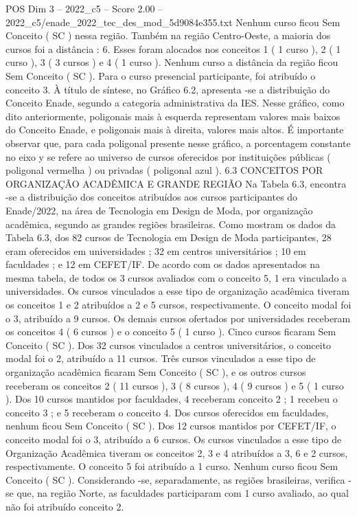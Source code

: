 \begin{textsample}{POS Dim 3 – 2022\_c5 – Score 2.00 – 2022\_c5/enade\_2022\_tec\_des\_mod\_5d9084e355.txt}
Nenhum curso ficou Sem Conceito ( SC ) nessa região.
Também na região Centro-Oeste, a maioria dos cursos foi a distância : 6.
Esses foram alocados nos conceitos 1 ( 1 curso ), 2 ( 1 curso ), 3 ( 3 cursos ) e 4 ( 1 curso ).
Nenhum curso a distância da região ficou Sem Conceito ( SC ).
Para o curso presencial participante, foi atribuído o conceito 3.
À título de síntese, no Gráfico 6.2, apresenta -se a distribuição do Conceito Enade, segundo a categoria administrativa da IES.
Nesse gráfico, como dito anteriormente, poligonais mais à esquerda representam valores mais baixos do Conceito Enade, e poligonais mais à direita, valores mais altos.
É importante observar que, para cada poligonal presente nesse gráfico, a porcentagem constante no eixo y se refere ao universo de cursos oferecidos por instituições públicas ( poligonal vermelha ) ou privadas ( poligonal azul ). 6.3 CONCEITOS POR ORGANIZAÇÃO ACADÊMICA E GRANDE REGIÃO Na Tabela 6.3, encontra -se a distribuição dos conceitos atribuídos aos cursos participantes do Enade/2022, na área de Tecnologia em Design de Moda, por organização acadêmica, segundo as grandes regiões brasileiras.
Como mostram os dados da Tabela 6.3, dos 82 cursos de Tecnologia em Design de Moda participantes, 28 eram oferecidos em universidades ; 32 em centros universitários ; 10 em faculdades ; e 12 em CEFET/IF.
De acordo com os dados apresentados na mesma tabela, de todos os 3 cursos avaliados com o conceito 5, 1 era vinculado a universidades.
Os cursos vinculados a esse tipo de organização acadêmica tiveram os conceitos 1 e 2 atribuídos a 2 e 5 cursos, respectivamente.
O conceito modal foi o 3, atribuído a 9 cursos.
Os demais cursos ofertados por universidades receberam os conceitos 4 ( 6 cursos ) e o conceito 5 ( 1 curso ).
Cinco cursos ficaram Sem Conceito ( SC ).
Dos 32 cursos vinculados a centros universitários, o conceito modal foi o 2, atribuído a 11 cursos.
Três cursos vinculados a esse tipo de organização acadêmica ficaram Sem Conceito ( SC ), e os outros cursos receberam os conceitos 2 ( 11 cursos ), 3 ( 8 cursos ), 4 ( 9 cursos ) e 5 ( 1 curso ).
Dos 10 cursos mantidos por faculdades, 4 receberam conceito 2 ; 1 recebeu o conceito 3 ; e 5 receberam o conceito 4.
Dos cursos oferecidos em faculdades, nenhum ficou Sem Conceito ( SC ).
Dos 12 cursos mantidos por CEFET/IF, o conceito modal foi o 3, atribuído a 6 cursos.
Os cursos vinculados a esse tipo de Organização Acadêmica tiveram os conceitos 2, 3 e 4 atribuídos a 3, 6 e 2 cursos, respectivamente.
O conceito 5 foi atribuído a 1 curso.
Nenhum curso ficou Sem Conceito ( SC ).
Considerando -se, separadamente, as regiões brasileiras, verifica -se que, na região Norte, as faculdades participaram com 1 curso avaliado, ao qual não foi atribuído conceito 2.

\end{textsample}
